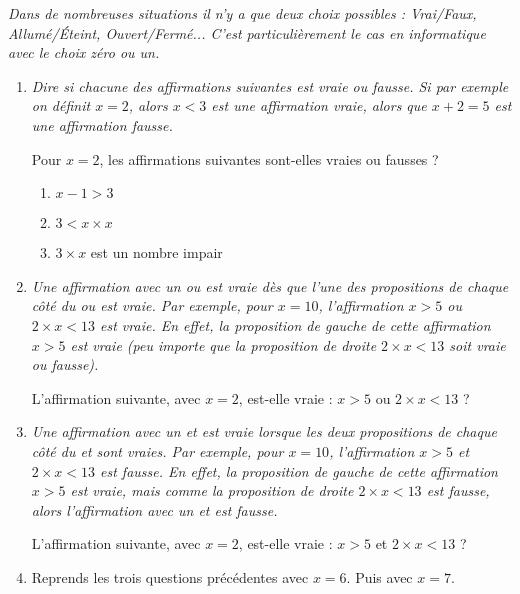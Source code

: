 \documentclass[class=report,crop=false, 12pt]{standalone}
\begin{document}


\emph{Dans de nombreuses situations il n'y a que deux choix possibles : Vrai/Faux, Allumé/Éteint, Ouvert\slash Fermé... C'est particulièrement le cas en informatique avec le choix zéro ou un.}

\bigskip
\bigskip


\begin{activite}
\sauteligne
\begin{enumerate}
  \item \emph{Dire si chacune des affirmations suivantes est vraie ou fausse. Si par exemple on définit $x = 2$, alors \og $x < 3$ \fg{} est une affirmation vraie, alors que \og $x + 2 = 5$ \fg{} est une affirmation fausse.}
 
  Pour $x=2$, les affirmations suivantes sont-elles vraies ou fausses ?
  \begin{enumerate}
    \item \og $x - 1 > 3$ \fg{}
    \item \og $3 < x \times x$ \fg{}
    \item \og $3 \times x$ est un nombre impair \fg{}
  \end{enumerate}  
  
  \item \emph{Une affirmation avec un \og ou \fg{} est vraie dès que l'une des propositions de chaque côté du \og ou \fg{} est vraie. Par exemple, pour $x=10$, l'affirmation  
\og $x > 5$ ou $2 \times x < 13$ \fg{} est vraie. En effet, la proposition de gauche de cette affirmation \og $x>5$ \fg{} est vraie (peu importe que la proposition de droite  \og $2 \times x < 13$ \fg{} soit vraie ou fausse).}
  
  L'affirmation suivante, avec $x=2$, est-elle vraie : \og $x > 5$ ou $2 \times x < 13$ \fg{}  ?

  
  \item \emph{Une affirmation avec un \og et \fg{} est vraie lorsque les deux propositions de chaque côté du \og et \fg{} sont vraies. Par exemple, pour $x=10$, l'affirmation  
\og $x > 5$ et $2 \times x < 13$ \fg{} est fausse. En effet, la proposition de gauche de cette affirmation \og $x>5$ \fg{} est vraie, mais comme la proposition de droite  \og $2 \times x < 13$ \fg{} est fausse, alors l'affirmation avec un \og et \fg{} est fausse.}
  
  L'affirmation suivante, avec $x=2$, est-elle vraie : \og $x > 5$ et $2 \times x < 13$ \fg{} ?
  
  \item Reprends les trois questions précédentes avec $x = 6$. Puis avec $x = 7$.
  

\end{enumerate}
\end{activite}
\end{document}
